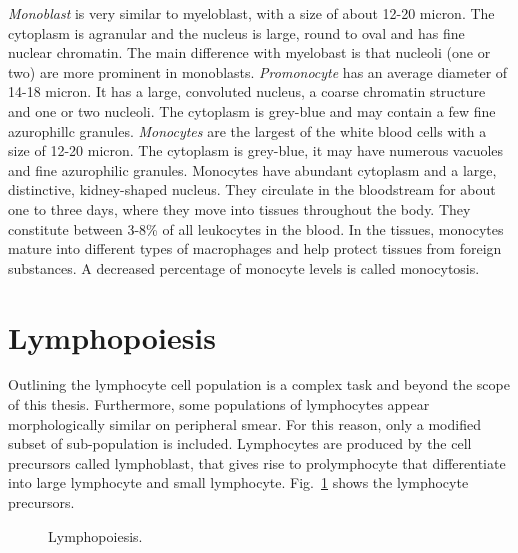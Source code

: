 \documentclass[final,a4paper,12pt,english]{UnicaPhdThesis3}
\begin{document}
\textit{Monoblast} is very similar to myeloblast, with a size of about 12-20 micron. The cytoplasm is agranular and the nucleus is large, round to oval and has fine nuclear chromatin. The main difference with myelobast is that nucleoli (one or two) are more prominent in monoblasts. \textit{Promonocyte} has an average diameter of 14-18 micron. It has a large, convoluted nucleus, a coarse chromatin structure and one or two nucleoli. The cytoplasm is grey-blue and may contain a few fine azurophillc granules. \textit{Monocytes} are the largest of the white blood cells with a size of 12-20 micron. The cytoplasm is grey-blue, it may have numerous vacuoles and fine azurophilic granules. Monocytes have abundant cytoplasm and a large, distinctive, kidney-shaped nucleus. They circulate in the bloodstream for about one to three days, where they move into tissues throughout the body. They constitute between 3-8\% of all leukocytes in the blood. In the tissues, monocytes mature into different types of macrophages and help protect tissues from foreign substances. A decreased percentage of monocyte levels is called monocytosis.

\section{Lymphopoiesis}
Outlining the lymphocyte cell population is a complex task and beyond the scope of this thesis. Furthermore, some populations of lymphocytes appear morphologically similar on peripheral smear. For this reason, only a modified subset of sub-population is included. Lymphocytes are produced by the cell precursors called lymphoblast, that gives rise to prolymphocyte that differentiate into large lymphocyte and small lymphocyte.
Fig.~\ref{fig:Lymphopoiesis} shows the lymphocyte precursors.

\begin{figure}[!htbp]
\centering
\caption{\label{fig:Lymphopoiesis} Lymphopoiesis.}
\end{figure}
\end{document}

